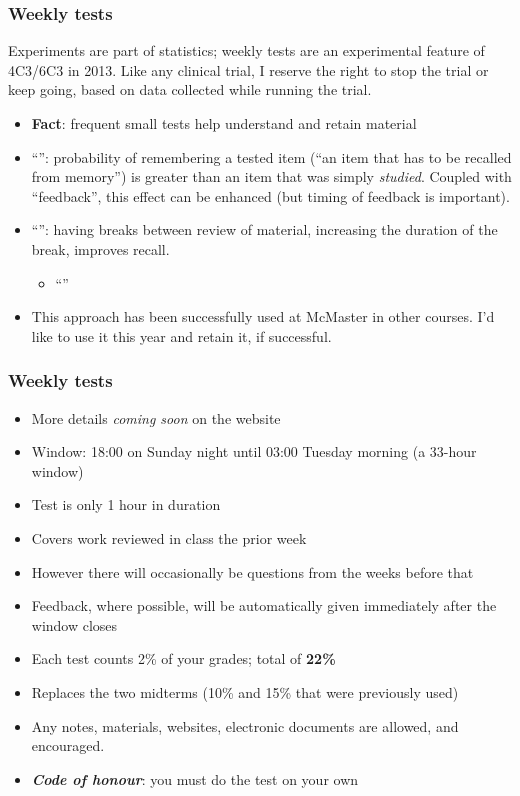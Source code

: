 \begin{frame}\frametitle{Weekly tests}
	\begin{exampleblock}{}
		Experiments are part of statistics; weekly tests are an experimental feature of 4C3/6C3 in 2013. Like any clinical trial, I reserve the right to stop the trial or keep going, based on data collected while running the trial.
	\end{exampleblock}

	\begin{itemize}
		\item	\textbf{Fact}: frequent small tests help understand and retain material
		\item	``\emph{{\color{purple}{Testing effect}}}'': probability of remembering a tested item (``an item that has to be recalled from memory'') is greater than an item that was simply \emph{studied}. Coupled with ``feedback'', this effect can be enhanced (but timing of feedback is important).
		\item	``{\color{purple}{Spacing effect}}'': having breaks between review of material, increasing the duration of the break, improves recall.
			\begin{itemize}
				\item	``{}''
			\end{itemize}
		
		\item	This approach has been successfully used at McMaster in other courses. I'd like to use it this year and retain it, if successful.
	\end{itemize}
\end{frame}

\begin{frame}\frametitle{Weekly tests}
	\begin{itemize}
		\item	More details \emph{coming soon} on the website
		\item	Window: 18:00 on Sunday night until 03:00 Tuesday morning (a 33-hour window)
		\item	Test is only 1 hour in duration
		\item	Covers work reviewed in class the prior week
		\item	However there will occasionally be questions from the weeks before that
		\item	Feedback, where possible, will be automatically given immediately after the window closes
		\item	Each test counts 2\% of your grades; total of \textbf{22\%}
		\item	Replaces the two midterms (10\% and 15\% that were previously used)
		\item	Any notes, materials, websites, electronic documents are allowed, and encouraged.
		\item	\textbf{\emph{Code of honour}}: you must do the test on your own
	\end{itemize}
\end{frame}

